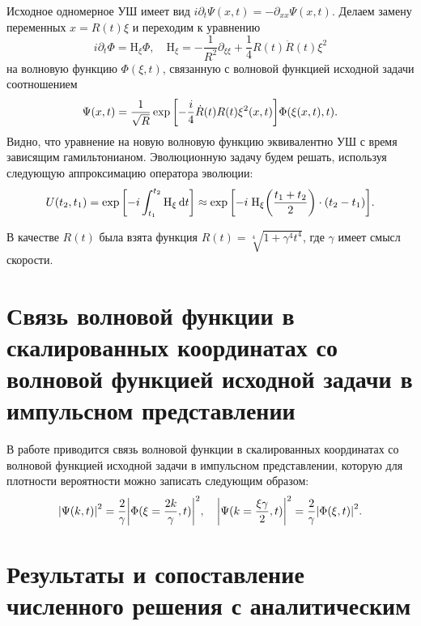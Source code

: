 \documentclass[10pt]{article}
\begin{document}
Исходное одномерное УШ имеет вид $i\partial_t \Psi(x,t) = -\partial_{xx} \Psi(x,t)$. Делаем замену переменных $x = R(t) \xi$ и переходим к уравнению
\begin{equation}
 i\partial_t \Phi = \mathrm{H}_\xi\Phi, \quad \mathrm{H}_\xi = -\dfrac{1}{R^2} \partial_{\xi\xi} + \dfrac{1}{4}R(t)\ddot{R}(t)\xi^2
\end{equation}
на волновую функцию $\Phi(\xi,t)$, связанную с волновой функцией исходной задачи соотношением
\begin{equation}
 \Psi(x,t) = \dfrac{1}{\sqrt{R}} \exp\qty[-\dfrac{i}{4} \dot{R}(t) R(t) \xi^2(x,t) ] \Phi(\xi(x,t),t).
\end{equation}
Видно, что уравнение на новую волновую функцию эквивалентно УШ с время зависящим гамильтонианом. Эволюционную задачу будем решать, используя следующую  аппроксимацию оператора эволюции:
\begin{equation}
 U(t_2,t_1) = \exp\qty[-i\int_{t_1}^{t_2} \mathrm{H}_\xi \dd{t}]\approx\exp\qty[-i\; \mathrm{H}_\xi\qty(\frac{t_1+t_2}{2})\cdot (t_2 - t_1)].
\end{equation}

В качестве $R(t)$ была взята функция $R(t) = \sqrt[4]{1+\gamma^4 t^4}$, где $\gamma$ имеет смысл скорости.

\section{Связь волновой функции в скалированных координатах со волновой функцией исходной задачи в импульсном представлении}

В работе \cite{roudnev} приводится связь волновой функции в скалированных координатах со волновой функцией исходной задачи в импульсном представлении, которую для плотности вероятности можно записать следующим образом:
\begin{equation}
	\abs{\Psi(k,t)}^2 = \dfrac{2}{\gamma} \abs{\Phi(\xi=\dfrac{2k}{\gamma} , t)}^2,
	\quad 
	\abs{\Psi(k=\dfrac{\xi \gamma}{2},t)}^2 = \dfrac{2}{\gamma} \abs{\Phi(\xi , t)}^2.
\end{equation}

\section{Результаты и сопоставление численного решения с аналитическим}
\end{document}
